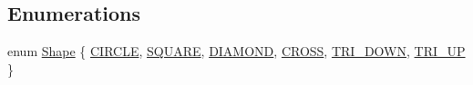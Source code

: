 \subsection*{Enumerations}
\begin{DoxyCompactItemize}
\item 
enum \mbox{\hyperlink{namespacebridges_a1b4050586bd708782ae0d4f3b06b9579}{Shape}} \{ \newline
\mbox{\hyperlink{namespacebridges_a1b4050586bd708782ae0d4f3b06b9579aa968bf0f7aeccbae1a40751345bf2e64}{C\+I\+R\+C\+LE}}, 
\mbox{\hyperlink{namespacebridges_a1b4050586bd708782ae0d4f3b06b9579a4fc84095f1e7f3e664913b93050196e2}{S\+Q\+U\+A\+RE}}, 
\mbox{\hyperlink{namespacebridges_a1b4050586bd708782ae0d4f3b06b9579aefd26c044477c7b165bc744110e0ee93}{D\+I\+A\+M\+O\+ND}}, 
\mbox{\hyperlink{namespacebridges_a1b4050586bd708782ae0d4f3b06b9579abe7bf91f3fc0356925109d7afdd43135}{C\+R\+O\+SS}}, 
\newline
\mbox{\hyperlink{namespacebridges_a1b4050586bd708782ae0d4f3b06b9579af9a87963ef14566f72813a071197c862}{T\+R\+I\+\_\+\+D\+O\+WN}}, 
\mbox{\hyperlink{namespacebridges_a1b4050586bd708782ae0d4f3b06b9579a8398d7a1be69eeabd701010f70c4b769}{T\+R\+I\+\_\+\+UP}}
 \}
\end{DoxyCompactItemize}
